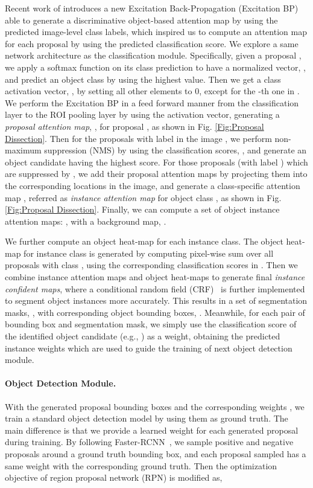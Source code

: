 \documentclass[10pt,twocolumn,letterpaper]{article}
\begin{document}
Recent work of \cite{zhang2016top} introduces a new Excitation Back-Propagation (Excitation BP) able to generate a discriminative object-based attention map by using the predicted image-level class labels, which inspired us to compute an attention map for each proposal by using the predicted classification score. We explore a same network architecture as the classification module.
Specifically, given a proposal , we apply a softmax function on its class prediction  to have a normalized vector, , and predict an object class  by using the highest value. Then we get a class activation vector,  , by setting all other elements to 0, except for the -th one in .
We perform the Excitation BP \cite{zhang2016top} in a feed forward manner from the classification layer to the ROI pooling layer by using the activation vector, generating a \emph{proposal attention map}, , for proposal , as shown in Fig. \ref{Fig:Proposal Dissection}.
Then for the proposals with label  in the image , we perform non-maximum suppression (NMS) by using the classification scores, , and generate an object candidate  having the highest score. For those proposals (with label ) which are suppressed by , we add their proposal attention maps by projecting them into the corresponding locations in the image, and generate a class-specific attention map , referred as \emph{instance attention map} for object class , as shown in Fig. \ref{Fig:Proposal Dissection}.
Finally, we can compute a set of object instance attention maps: , with a background map, .

We further compute an object heat-map for each instance class. The object heat-map for instance class  is generated by computing pixel-wise sum over all proposals with class , using the corresponding classification scores in . Then we combine instance attention maps and object heat-maps to generate final  \emph{instance confident maps}, where a conditional random field (CRF)~\cite{krahenbuhl2011efficient} is further implemented to segment object instances more accurately. This results in a set of segmentation masks, , with corresponding object bounding boxes, . Meanwhile, for each pair of bounding box and segmentation mask, we simply use the classification score of the identified object candidate (e.g., ) as a weight, obtaining the predicted instance weights  which are used to guide the training of next object detection module.
\vspace{-3mm}

\paragraph{Object Detection Module.} With the generated proposal bounding boxes  and the corresponding weights , we train a standard object detection model by using them as ground truth.  The main difference is that we provide a learned weight for each generated proposal during training. By following Faster-RCNN~\cite{ren2015faster}, we sample positive and negative proposals around a ground truth bounding box, and each proposal sampled has a same weight with the corresponding ground truth.
Then the optimization objective of region proposal network (RPN) is modified as,
\end{document}
